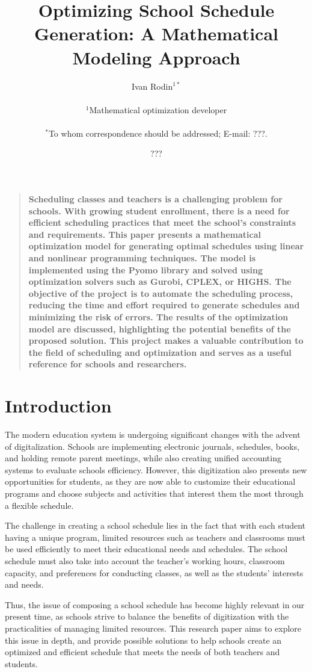 \documentclass{article}
\title{Optimizing School Schedule Generation: A Mathematical Modeling Approach}
\author
{Ivan Rodin$^{1\ast}$\\
\\
\normalsize{$^{1}$Mathematical optimization developer}\\
\\
\normalsize{$^\ast$To whom correspondence should be addressed; E-mail:  ???.}
}
\date{???}
\newenvironment{sciabstract}{%
\begin{quote} \bf}
{\end{quote}}
\begin{document}
 

\baselineskip24pt

\maketitle 


\begin{sciabstract}
  Scheduling classes and teachers is a challenging problem for schools. With growing student enrollment, there is a need for efficient scheduling practices that meet the school's constraints and requirements. This paper presents a mathematical optimization model for generating optimal schedules using linear and nonlinear programming techniques. The model is implemented using the Pyomo library and solved using optimization solvers such as Gurobi, CPLEX, or HIGHS. The objective of the project is to automate the scheduling process, reducing the time and effort required to generate schedules and minimizing the risk of errors. The results of the optimization model are discussed, highlighting the potential benefits of the proposed solution. This project makes a valuable contribution to the field of scheduling and optimization and serves as a useful reference for schools and researchers.
\end{sciabstract}


\section*{Introduction}

The modern education system is undergoing significant changes with the advent of digitalization. Schools are implementing electronic journals, schedules, books, and holding remote parent meetings, while also creating unified accounting systems to evaluate schools efficiency. However, this digitization also presents new opportunities for students, as they are now able to customize their educational programs and choose subjects and activities that interest them the most through a flexible schedule.

The challenge in creating a school schedule lies in the fact that with each student having a unique program, limited resources such as teachers and classrooms must be used efficiently to meet their educational needs and schedules. The school schedule must also take into account the teacher's working hours, classroom capacity, and preferences for conducting classes, as well as the students' interests and needs.

Thus, the issue of composing a school schedule has become highly relevant in our present time, as schools strive to balance the benefits of digitization with the practicalities of managing limited resources. This research paper aims to explore this issue in depth, and provide possible solutions to help schools create an optimized and efficient schedule that meets the needs of both teachers and students.
\end{document}
